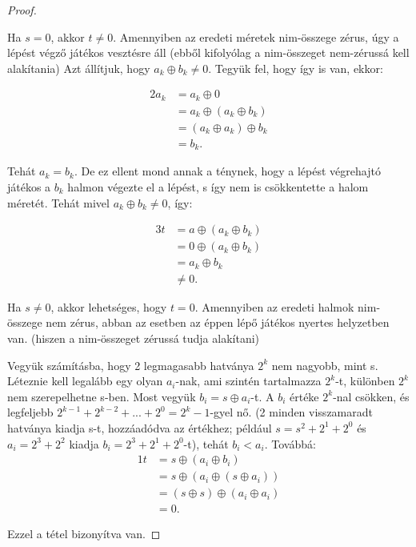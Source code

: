 \begin{proof}
\begin{lemma}
Ha $s = 0$, akkor $t \neq 0$. Amennyiben az eredeti méretek nim-összege zérus, úgy a lépést végző játékos vesztésre áll (ebből kifolyólag a nim-összeget nem-zérussá kell alakítania)\ujsor
Azt állítjuk, hogy $a_k \oplus b_k \neq 0$. Tegyük fel, hogy így is van, ekkor:

\begin{alignat*}{2}
	a_k &= a_k \oplus 0 \\
	&= a_k \oplus (a_k \oplus b_k) \\
	&= (a_k \oplus a_k) \oplus b_k \\
	&= b_k.
\end{alignat*}

Tehát $a_k = b_k$. De ez ellent mond annak a ténynek, hogy a lépést végrehajtó játékos a $b_k$ halmon végezte el a lépést, s így nem is csökkentette a halom méretét. \ujsor
Tehát mivel $a_k \oplus b_k \neq 0$, így:

\begin{alignat*}{3}
	t &= a \oplus (a_k \oplus b_k) \\
	&= 0 \oplus (a_k \oplus b_k) \\
	&= a_k \oplus b_k \\
	&\neq 0.
\end{alignat*}

\end{lemma}

\begin{lemma}
Ha $s \neq 0$, akkor lehetséges, hogy $t = 0$. Amennyiben  az eredeti halmok nim-összege nem zérus, abban az esetben az éppen lépő játékos nyertes helyzetben van. (hiszen a nim-összeget zérussá tudja alakítani) \ujsor

Vegyük számításba, hogy 2 legmagasabb hatványa $2^k$ nem nagyobb, mint s. Léteznie kell legalább egy olyan $a_i$-nak, ami szintén tartalmazza $2^k$-t, különben $2^k$ nem szerepelhetne s-ben. Most vegyük $b_i = s \oplus a_i$-t. A $b_i$ értéke $2^k$-nal csökken, és legfeljebb $2^{k-1} + 2^{k-2} + ... + 2^0 = 2^k -1 $-gyel nő. (2 minden visszamaradt hatványa kiadja s-t, hozzáadódva az értékhez; például $s = s^2 + 2^1 + 2^0$ és $a_i = 2^3 + 2^2$ kiadja $b_i = 2^3 + 2^1 + 2^0$-t), tehát $b_i < a_i$. Továbbá:
\begin{alignat*}{1}
	t &= s \oplus (a_i \oplus b_i) \\
	&= s \oplus (a_i \oplus (s \oplus a_i)) \\
	&= (s \oplus s) \oplus (a_i \oplus a_i) \\
	&= 0.
\end{alignat*}
\end{lemma}

Ezzel a tétel bizonyítva van.
\end{proof}

